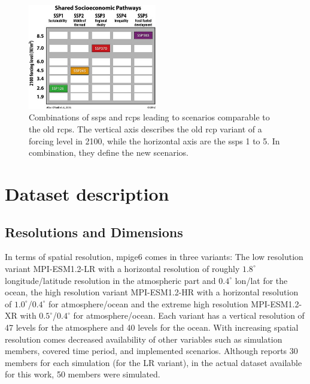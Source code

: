 \begin{figure}[bht]
  \begin{center}
    \includegraphics[width=0.5\textwidth]{figures/ssp_rcp_matrix.jpeg}
  \end{center}
  \caption[Overview CMIP6 SSP RCP Scenarios]{Combinations of \acp{ssp} and \acp{rcp} leading to scenarios comparable to the old \acp{rcp}. The vertical axis describes the old \ac{rcp} variant of a forcing level in 2100, while the horizontal axis are the \acp{ssp} 1 to 5. In combination, they define the new scenarios. \cite{bottinger_michael_ssp_nodate}}
  \label{fig:ssprcp}
\end{figure}


\section{Dataset description}




\subsection{Resolutions and Dimensions}
\label{sec:dataset-description}

In terms of spatial resolution, \ac{mpige6} comes in three variants: The low resolution variant MPI-ESM1.2-LR with a horizontal resolution of roughly $1.8^\circ$ longitude/latitude resolution in the atmospheric part and $0.4^\circ$ lon/lat for the ocean, the high resolution variant MPI-ESM1.2-HR with a horizontal resolution of $1.0^\circ$/$0.4^\circ$ for atmosphere/ocean and the extreme high resolution MPI-ESM1.2-XR with $0.5^\circ$/$0.4^\circ$ for atmosphere/ocean. 
Each variant has a vertical resolution of 47 levels for the atmosphere and 40 levels for the ocean.
With increasing spatial resolution comes decreased availability of other variables such as simulation members, covered time period, and implemented scenarios. 
Although \cite{olonscheck_new_2023} reports 30 members for each simulation (for the LR variant), in the actual dataset available for this work, 50 members were simulated. 

